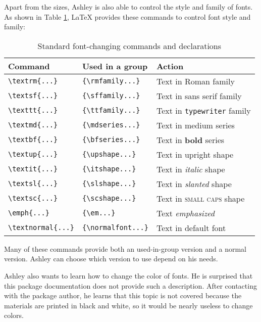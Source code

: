 Apart from the sizes, Ashley is also able to control the style and family of fonts. As shown in Table \ref{tab:stdfontcmds}, \LaTeX{} provides these commands to control font style and family:
\begin{table}[htbp]
\begin{tabular}{lll}
Command & Used in a group & Action\\
\hline
\verb=\textrm{...}= & \verb={\rmfamily...}= & {Text in \textrm{Roman} family} \\
\verb=\textsf{...}= & \verb={\sffamily...}= & {Text in \textsf{sans serif} family} \\
\verb=\texttt{...}= & \verb={\ttfamily...}= & {Text in \texttt{typewriter} family} \vspace{.15cm}\\
\verb=\textmd{...}= & \verb={\mdseries...}= & {Text in \textmd{medium} series} \\
\verb=\textbf{...}= & \verb={\bfseries...}= & {Text in \textbf{bold} series} \vspace{.15cm}\\
\verb=\textup{...}= & \verb={\upshape...}= & {Text in \textup{upright} shape} \\
\verb=\textit{...}= & \verb={\itshape...}= & {Text in \textit{italic} shape} \\
\verb=\textsl{...}= & \verb={\slshape...}= & {Text in \textsl{slanted} shape} \\
\verb=\textsc{...}= & \verb={\scshape...}= & {Text in \textsc{small caps} shape} \vspace{.15cm}\\
\verb=\emph{...}= & \verb={\em...}= & {Text \emph{emphasized}}\vspace{.15cm}\\
\verb=\textnormal{...}= & \verb={\normalfont...}= & {Text in default font}
\end{tabular}
\caption{Standard font-changing commands and declarations}
\label{tab:stdfontcmds}
\end{table}

Many of these commands provide both an used-in-group version and a normal version. Ashley can choose which version to use depend on his needs.

Ashley also wants to learn how to change the color of fonts. He is surprised that this package documentation does not provide such a description. After contacting with the package author, he learns that this topic is not covered because the materials are printed in black and white, so it would be nearly useless to change colors.


